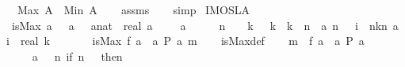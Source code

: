 \begin{isabellebody}
\ \ \ {\isachardoublequoteopen}Max\ A\ {\isasymge}\ Min\ A{\isachardoublequoteclose}\isanewline
%
\isadelimproof
\ \ %
\endisadelimproof
%
\isatagproof
{}\isamarkupfalse%
\ assms\isanewline
\ \ \isamarkupfalse%
\ simp%
\endisatagproof
{\isafoldproof}%
%
\isadelimproof
\isanewline
%
\endisadelimproof
\isanewline
{}\isamarkupfalse%
\ IMO{}{}{}{}SL{\isacharunderscore}A{}{\isacharcolon}\isanewline
\ \ \isanewline
\ \ {\isachardoublequoteopen}is{\isacharunderscore}Max\ {\isacharbraceleft}a\ {}{}{}{}\ {\isacharminus}\ a\ {}{}{}{}\ {\isacharbar}\ a{\isacharcolon}{\isacharcolon}nat\ {\isasymRightarrow}\ real{\isachardot}\ a\ {}\ {\isacharequal}\ {}\ {\isasymand}\ a\ {}\ {\isacharequal}\ {}\ {\isasymand}\ {\isacharparenleft}{\isasymforall}\ n\ {\isasymge}\ {}{\isachardot}\ {\isasymexists}\ k{\isachardot}\ {}\ {\isasymle}\ k\ {\isasymand}\ k\ {\isasymle}\ n\ {\isasymand}\ a\ n\ {\isacharequal}\ {\isacharparenleft}{\isasymSum}\ i\ {\isasymleftarrow}\ {\isacharbrackleft}n{\isacharminus}k{\isachardot}{\isachardot}{\isacharless}n{\isacharbrackright}{\isachardot}\ a\ i{\isacharparenright}\ {\isacharslash}\ real\ k{\isacharparenright}{\isacharbraceright}\isanewline
\ \ \ {\isacharparenleft}{}{}{}{}\ {\isacharslash}\ {}{}{}{}{\isacharcircum}{}{\isacharparenright}{\isachardoublequoteclose}\ {\isacharparenleft}\ {\isachardoublequoteopen}is{\isacharunderscore}Max\ {\isacharbraceleft}{\isacharquery}f\ a\ {\isacharbar}\ a{\isachardot}\ {\isacharquery}P\ a{\isacharbraceright}\ {\isacharquery}m{\isachardoublequoteclose}{\isacharparenright}\isanewline
%
\isadelimproof
\ \ %
\endisadelimproof
%
\isatagproof
{}\isamarkupfalse%
\ is{\isacharunderscore}Max{\isacharunderscore}def\isanewline
{}\isamarkupfalse%
\isanewline
\ \ \isamarkupfalse%
\ {\isachardoublequoteopen}{\isacharquery}m\ {\isasymin}\ {\isacharbraceleft}{\isacharquery}f\ a\ {\isacharbar}\ a{\isachardot}\ {\isacharquery}P\ a{\isacharbraceright}{\isachardoublequoteclose}\isanewline
\ \ \isamarkupfalse%
{\isacharminus}\isanewline
\ \ \ \ \isamarkupfalse%
\ {\isacharquery}a\ {\isacharequal}\ {\isachardoublequoteopen}{\isacharparenleft}{\isasymlambda}\ n{\isachardot}\ if\ n\ {\isacharequal}\ {}\ then\ {}\isanewline

\end{isabellebody}
